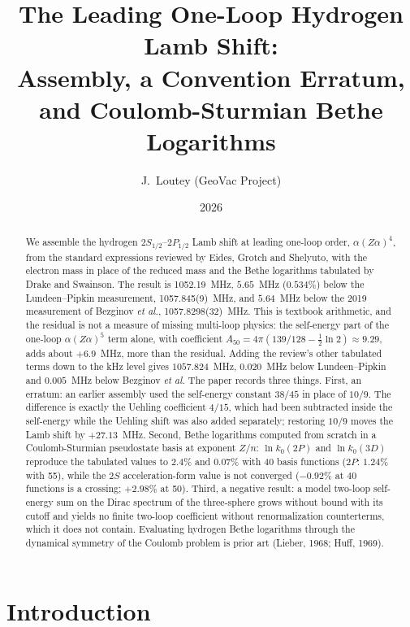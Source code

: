 \documentclass[11pt]{article}
\title{The Leading One-Loop Hydrogen Lamb Shift:\\
Assembly, a Convention Erratum, and Coulomb-Sturmian Bethe Logarithms}
\author{J.~Loutey (GeoVac Project)}
\date{2026}
\begin{document}
\maketitle

\begin{abstract}
We assemble the hydrogen $2S_{1/2}$--$2P_{1/2}$ Lamb shift at leading
one-loop order, $\alpha(Z\alpha)^4$, from the standard expressions
reviewed by Eides, Grotch and Shelyuto, with the electron mass in
place of the reduced mass and the Bethe logarithms tabulated by Drake
and Swainson.  The result is 1052.19~MHz, $5.65$~MHz ($0.534\%$)
below the Lundeen--Pipkin measurement, 1057.845(9)~MHz, and $5.64$~MHz
below the 2019 measurement of Bezginov \emph{et al.},
1057.8298(32)~MHz.  This is textbook arithmetic, and the residual is
not a measure of missing multi-loop physics: the self-energy part of
the one-loop $\alpha(Z\alpha)^5$ term alone, with coefficient
$A_{50} = 4\pi(139/128 - \tfrac12\ln 2) \approx 9.29$, adds about
$+6.9$~MHz, more than the residual.  Adding the review's other
tabulated terms down to the kHz level gives $1057.824$~MHz, $0.020$~MHz below Lundeen--Pipkin and
$0.005$~MHz below Bezginov \emph{et al.}  The paper records three things.
First, an erratum: an earlier assembly used the self-energy constant
$38/45$ in place of $10/9$.  The difference is exactly the Uehling
coefficient $4/15$, which had been subtracted inside the self-energy
while the Uehling shift was also added separately; restoring $10/9$
moves the Lamb shift by $+27.13$~MHz.  Second, Bethe logarithms
computed from scratch in a Coulomb-Sturmian pseudostate basis at
exponent $Z/n$: $\ln k_0(2P)$ and $\ln k_0(3D)$ reproduce the tabulated
values to $2.4\%$ and $0.07\%$ with 40 basis functions ($2P$: $1.24\%$
with 55), while the $2S$ acceleration-form value is not converged
($-0.92\%$ at 40 functions is a crossing; $+2.98\%$ at 50).  Third, a
negative result: a model two-loop self-energy sum on the Dirac
spectrum of the three-sphere grows without bound with its cutoff and
yields no finite two-loop coefficient without renormalization
counterterms, which it does not contain.  Evaluating hydrogen Bethe
logarithms through the dynamical symmetry of the Coulomb problem is
prior art (Lieber, 1968; Huff, 1969).
\end{abstract}

\section{Introduction}
\label{sec:intro}
\end{document}
